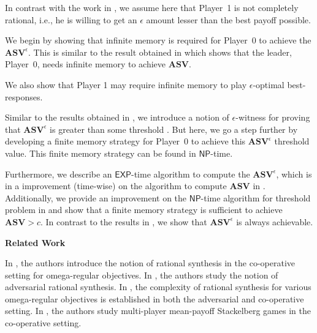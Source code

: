 In contrast with the work in \cite{FGR20}, we assume here that Player~1 is not completely rational, i.e., he is willing to get an $\epsilon$ amount lesser than the best payoff possible. 

We begin by showing that infinite memory is required for Player~0 to achieve the $\mathbf{ASV}^{\epsilon}$. This is similar to the result obtained in \cite{FGR20} which shows that the leader, Player~0, needs infinite memory to achieve $\mathbf{ASV}$. 

We also show that Player 1 may require infinite memory to play $\epsilon$-optimal best-responses. 

Similar to the results obtained in \cite{FGR20}, we introduce a notion of $\epsilon$-witness for proving that $\mathbf{ASV}^{\epsilon}$ is greater than some threshold . But here, we go a step further by developing a finite memory strategy for Player~0 to achieve this $\mathbf{ASV}^{\epsilon}$ threshold value. This finite memory strategy can be found in $\mathsf{NP}$-time. 

Furthermore, we describe an $\mathsf{EXP}$-time algorithm to compute the $\mathbf{ASV}^{\epsilon}$, which is in a improvement (time-wise) on the algorithm to compute $\mathbf{ASV}$ in \cite{FGR20}. Additionally, we provide an improvement on the $\mathsf{NP}$-time algorithm for threshold problem in \cite{FGR20} and show that a finite memory strategy is sufficient to achieve $\mathbf{ASV} > c$. In contrast to the results in \cite{FGR20}, we show that $\mathbf{ASV}^{\epsilon}$ is always achievable.

\textbf{Related Work} 

In \cite{FKL10}, the authors introduce the notion of rational synthesis in the co-operative setting for omega-regular objectives. In \cite{KPV16}, the authors study the notion of adversarial rational synthesis. In \cite{CFGR16}, the complexity of rational synthesis for various omega-regular objectives is established in both the adversarial and co-operative setting. In \cite{GS14}, the authors study multi-player mean-payoff Stackelberg games in the co-operative setting.


